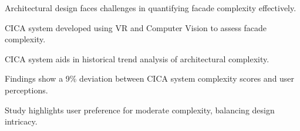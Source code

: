 

\item Architectural design faces challenges in quantifying facade complexity effectively.
\item CICA system developed using VR and Computer Vision to assess facade complexity.
\item CICA system aids in historical trend analysis of architectural complexity.
\item Findings show a 9\% deviation between CICA system complexity scores and user perceptions.
\item Study highlights user preference for moderate complexity, balancing design intricacy.



